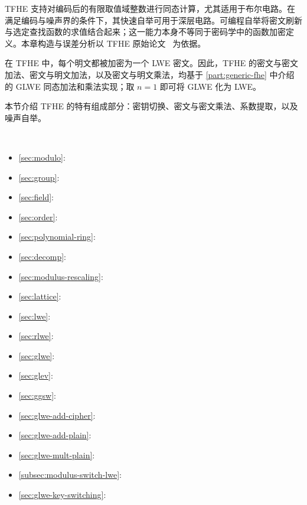 
TFHE 支持对编码后的有限取值域整数进行同态计算，尤其适用于布尔电路。在满足编码与噪声界的条件下，其快速自举可用于深层电路。可编程自举将密文刷新与选定查找函数的求值结合起来；这一能力本身不等同于密码学中的函数加密定义。本章构造与误差分析以 TFHE 原始论文~\cite{tfhe-original} 为依据。

在 TFHE 中，每个明文都被加密为一个 LWE 密文。因此，TFHE 的密文与密文加法、密文与明文加法，以及密文与明文乘法，均基于 \autoref{part:generic-fhe} 中介绍的 GLWE 同态加法和乘法实现；取 $n = 1$ 即可将 GLWE 化为 LWE。

本节介绍 TFHE 的特有组成部分：密钥切换、密文与密文乘法、系数提取，以及噪声自举。

$ $

\begin{tcolorbox}[
    title = \textbf{所需背景知识},    %
    colback = white,    %
    colframe = black,  %
    boxrule = 0.8pt,     %
    left = 1mm, right = 1mm, top = 1mm, bottom = 1mm %
]
\begin{itemize}
  \item \autoref{sec:modulo}: 
  \item \autoref{sec:group}: 
  \item \autoref{sec:field}: 
  \item \autoref{sec:order}: 
  \item \autoref{sec:polynomial-ring}: 
  \item \autoref{sec:decomp}: 
  \item \autoref{sec:modulus-rescaling}: 
  \item \autoref{sec:lattice}: 
  \item \autoref{sec:lwe}: 
  \item \autoref{sec:rlwe}: 
  \item \autoref{sec:glwe}: 
  \item \autoref{sec:glev}: 
  \item \autoref{sec:ggsw}: 
  \item \autoref{sec:glwe-add-cipher}: 
  \item \autoref{sec:glwe-add-plain}: 
  \item \autoref{sec:glwe-mult-plain}: 
  \item \autoref{subsec:modulus-switch-lwe}: 
  \item \autoref{sec:glwe-key-switching}: 
\end{itemize}
\end{tcolorbox}

